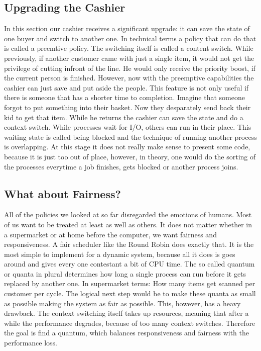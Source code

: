 \subsection{Upgrading the Cashier}

In this section our cashier receives a significant upgrade: it can save the state of one buyer and switch to another one.
In technical terms a policy that can do that is called a preemtive policy. 
The switching itself is called a content switch.
While previously, if another customer came with just a single item, it would not get the privilege of cutting infront of the line. 
He would only receive the priority boost, if the current person is finished.
However, now with the preemptive capabilities the cashier can just save and put aside the people.
This feature is not only useful if there is someone that has a shorter time to completion.
Imagine that someone forgot to put something into their basket.
Now they desparately send back their kid to get that item. While he returns the cashier can save the state and do a context switch.
While processes wait for I/O, others can run in their place.
This waiting state is called being blocked and the technique of running another process is overlapping.
At this stage it does not really make sense to present some code, because it is just too out of place, however, in theory, one would do the sorting of the processes everytime a job finishes, gets blocked or another process joins.

\subsection{What about Fairness?} \label{sec:rr}

All of the policies we looked at so far disregarded the emotions of humans.
Most of us want to be treated at least as well as others.
It does not matter whether in a supermarket or at home before the computer, we want fairness and responsiveness.
A fair scheduler like the Round Robin does exactly that. 
It is the most simple to implement for a dynamic system, because all it does is goes around and gives every one contestant a bit of CPU time.
The so called quantum or quanta in plural determines how long a single process can run before it gets replaced by another one.
In supermarket terms: How many items get scanned per customer per cycle.
The logical next step would be to make these quanta as small as possible making the system as fair as possible.
This, however, has a heavy drawback.
The context switching itself takes up resources, meaning that after a while the performance degrades, because of too many context switches.
Therefore the goal is find a quantum, which balances responsiveness and fairness with the performance loss.




